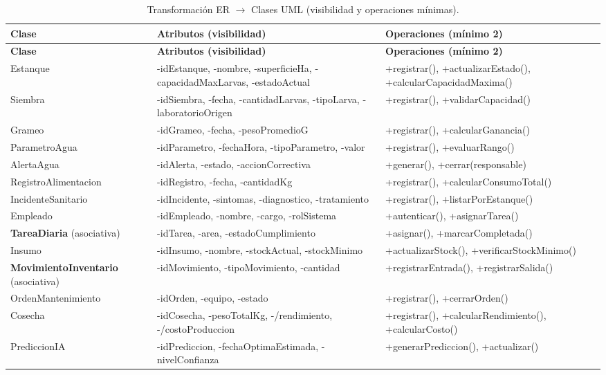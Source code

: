 \documentclass[11pt,a4paper]{report}
\begin{document}
{\footnotesize
\begin{longtable}{L{3.5cm}L{5.6cm}L{5.1cm}}
\caption{Transformación ER $\rightarrow$ Clases UML (visibilidad y operaciones mínimas).}\label{tab:clases}\\
\toprule
\textbf{Clase} & \textbf{Atributos (visibilidad)} & \textbf{Operaciones (mínimo 2)} \\
\midrule
\endfirsthead
\toprule
\textbf{Clase} & \textbf{Atributos (visibilidad)} & \textbf{Operaciones (mínimo 2)} \\
\midrule
\endhead
\bottomrule
\endfoot
Estanque & -idEstanque, -nombre, -superficieHa, -capacidadMaxLarvas, -estadoActual & +registrar(), +actualizarEstado(), +calcularCapacidadMaxima() \\
Siembra & -idSiembra, -fecha, -cantidadLarvas, -tipoLarva, -laboratorioOrigen & +registrar(), +validarCapacidad() \\
Grameo & -idGrameo, -fecha, -pesoPromedioG & +registrar(), +calcularGanancia() \\
ParametroAgua & -idParametro, -fechaHora, -tipoParametro, -valor & +registrar(), +evaluarRango() \\
AlertaAgua & -idAlerta, -estado, -accionCorrectiva & +generar(), +cerrar(responsable) \\
RegistroAlimentacion & -idRegistro, -fecha, -cantidadKg & +registrar(), +calcularConsumoTotal() \\
IncidenteSanitario & -idIncidente, -sintomas, -diagnostico, -tratamiento & +registrar(), +listarPorEstanque() \\
Empleado & -idEmpleado, -nombre, -cargo, -rolSistema & +autenticar(), +asignarTarea() \\
\textbf{TareaDiaria} (asociativa) & -idTarea, -area, -estadoCumplimiento & +asignar(), +marcarCompletada() \\
Insumo & -idInsumo, -nombre, -stockActual, -stockMinimo & +actualizarStock(), +verificarStockMinimo() \\
\textbf{MovimientoInventario} (asociativa) & -idMovimiento, -tipoMovimiento, -cantidad & +registrarEntrada(), +registrarSalida() \\
OrdenMantenimiento & -idOrden, -equipo, -estado & +registrar(), +cerrarOrden() \\
Cosecha & -idCosecha, -pesoTotalKg, -/rendimiento, -/costoProduccion & +registrar(), +calcularRendimiento(), +calcularCosto() \\
PrediccionIA & -idPrediccion, -fechaOptimaEstimada, -nivelConfianza & +generarPrediccion(), +actualizar() \\
\end{longtable}
}
\end{document}
